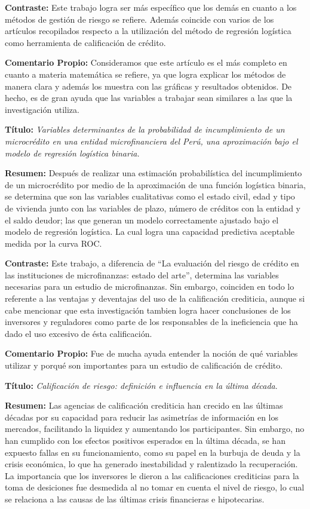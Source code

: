 \documentclass[
  letterpaper,
  DIV=11,
  numbers=noendperiod]{scrreprt}
\begin{document}
\textbf{Contraste:} Este trabajo logra ser más específico que los demás
en cuanto a los métodos de gestión de riesgo se refiere. Además coincide
con varios de los artículos recopilados respecto a la utilización del
método de regresión logística como herramienta de calificación de
crédito.

\textbf{Comentario Propio:} Consideramos que este artículo es el más
completo en cuanto a materia matemática se refiere, ya que logra
explicar los métodos de manera clara y además los muestra con las
gráficas y resultados obtenidos. De hecho, es de gran ayuda que las
variables a trabajar sean similares a las que la investigación utiliza.

\textbf{Título:} \emph{Variables determinantes de la probabilidad de
incumplimiento de un microcrédito en una entidad microfinanciera del
Perú, una aproximación bajo el modelo de regresión logística binaria.}

\textbf{Resumen:} Después de realizar una estimación probabilística del
incumplimiento de un microcrédito por medio de la aproximación de una
función logística binaria, se determina que son las variables
cualitativas como el estado civil, edad y tipo de vivienda junto con las
variables de plazo, número de créditos con la entidad y el saldo deudor;
las que generan un modelo correctamente ajustado bajo el modelo de
regresión logística. La cual logra una capacidad predictiva aceptable
medida por la curva ROC.

\textbf{Contraste:} Este trabajo, a diferencia de ``La evaluación del
riesgo de crédito en las instituciones de microfinanzas: estado del
arte'', determina las variables necesarias para un estudio de
microfinanzas. Sin embargo, coinciden en todo lo referente a las
ventajas y deventajas del uso de la calificación crediticia, aunque si
cabe mencionar que esta investigación tambien logra hacer conclusiones
de los inversores y reguladores como parte de los responsables de la
ineficiencia que ha dado el uso excesivo de ésta calificación.

\textbf{Comentario Propio:} Fue de mucha ayuda entender la noción de qué
variables utilizar y porqué son importantes para un estudio de
calificación de crédito.

\textbf{Título:} \emph{Calificación de riesgo: definición e influencia
en la última década}.

\textbf{Resumen:} Las agencias de calificación crediticia han crecido en
las últimas décadas por su capacidad para reducir las asimetrías de
información en los mercados, facilitando la liquidez y aumentando los
participantes. Sin embargo, no han cumplido con los efectos positivos
esperados en la última década, se han expuesto fallas en su
funcionamiento, como su papel en la burbuja de deuda y la crisis
económica, lo que ha generado inestabilidad y ralentizado la
recuperación. La importancia que los inversores le dieron a las
calificaciones crediticias para la toma de desiciones fue desmedida al
no tomar en cuenta el nivel de riesgo, lo cual se relaciona a las causas
de las últimas crisis financieras e hipotecarias.
\end{document}
